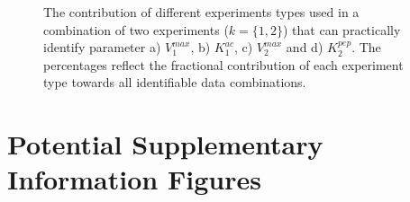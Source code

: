 \documentclass[10pt]{article}
\begin{document}
	\begin{figure}[!tbhp]
		\caption{The contribution of different experiments types used in a combination of two experiments ($k = \{1, 2\}$) that can practically identify parameter a) $V_1^{max}$, b) $K_1^{ac}$, c) $V_2^{max}$ and d) $K_2^{pep}$. The percentages reflect the fractional contribution of each experiment type towards all identifiable data combinations.}\label{fig:exp_info}
	\end{figure} 
	
	\clearpage

	\section{Potential Supplementary Information Figures}
	
\end{document}
